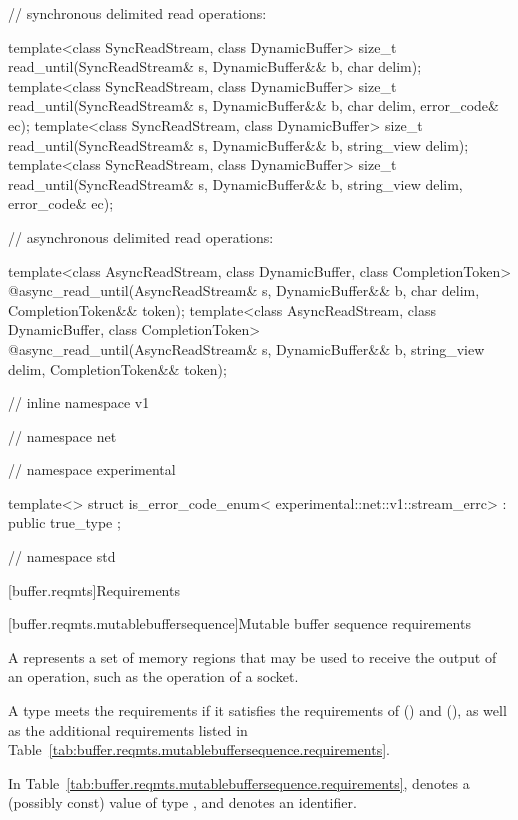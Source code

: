 \begin{codeblock}
{{{{  // synchronous delimited read operations:

  template<class SyncReadStream, class DynamicBuffer>
    size_t read_until(SyncReadStream& s, DynamicBuffer&& b, char delim);
  template<class SyncReadStream, class DynamicBuffer>
    size_t read_until(SyncReadStream& s, DynamicBuffer&& b,
                      char delim, error_code& ec);
  template<class SyncReadStream, class DynamicBuffer>
    size_t read_until(SyncReadStream& s, DynamicBuffer&& b, string_view delim);
  template<class SyncReadStream, class DynamicBuffer>
    size_t read_until(SyncReadStream& s, DynamicBuffer&& b,
                      string_view delim, error_code& ec);

  // asynchronous delimited read operations:

  template<class AsyncReadStream, class DynamicBuffer, class CompletionToken>
    @\DEDUCED@ async_read_until(AsyncReadStream& s,
                             DynamicBuffer&& b, char delim,
                             CompletionToken&& token);
  template<class AsyncReadStream, class DynamicBuffer, class CompletionToken>
    @\DEDUCED@ async_read_until(AsyncReadStream& s,
                             DynamicBuffer&& b, string_view delim,
                             CompletionToken&& token);

} // inline namespace v1
} // namespace net
} // namespace experimental

  template<> struct is_error_code_enum<
    experimental::net::v1::stream_errc>
      : public true_type {};

} // namespace std
\end{codeblock}



[buffer.reqmts]{Requirements}


[buffer.reqmts.mutablebuffersequence]{Mutable buffer sequence requirements}

\pnum
A  represents a set of memory regions that may be used to receive the output of an operation, such as the  operation of a socket.

\pnum
A type  meets the  requirements if it satisfies the requirements of  () and  (), as well as the additional requirements listed in Table~\ref{tab:buffer.reqmts.mutablebuffersequence.requirements}.

\pnum
In Table~\ref{tab:buffer.reqmts.mutablebuffersequence.requirements}, 
denotes a (possibly const) value of type , and  denotes an identifier.

